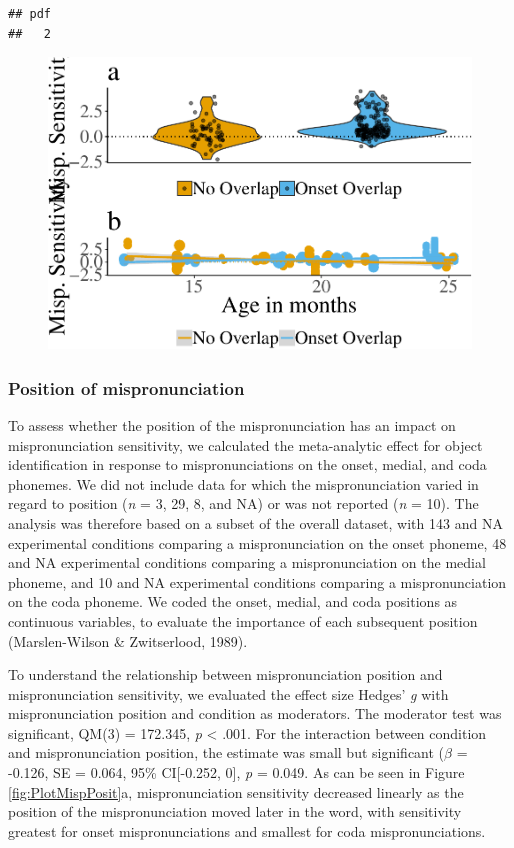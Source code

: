 \documentclass[man]{apa6}
\theoremstyle{definition}
\theoremstyle{definition}
\theoremstyle{definition}
\theoremstyle{remark}
\begin{document}
\begin{verbatim}
## pdf 
##   2
\end{verbatim}

\begin{figure}
\centering
\includegraphics{VonHolzenBergmann_MPMetaAnalysis_files/figure-latex/PlotDistOverlap-1.pdf}
\caption{}
\end{figure}

\subsubsection{Position of
mispronunciation}\label{position-of-mispronunciation}

To assess whether the position of the mispronunciation has an impact on
mispronunciation sensitivity, we calculated the meta-analytic effect for
object identification in response to mispronunciations on the onset,
medial, and coda phonemes. We did not include data for which the
mispronunciation varied in regard to position (\emph{n} = 3, 29, 8, and
NA) or was not reported (\emph{n} = 10). The analysis was therefore
based on a subset of the overall dataset, with 143 and NA experimental
conditions comparing a mispronunciation on the onset phoneme, 48 and NA
experimental conditions comparing a mispronunciation on the medial
phoneme, and 10 and NA experimental conditions comparing a
mispronunciation on the coda phoneme. We coded the onset, medial, and
coda positions as continuous variables, to evaluate the importance of
each subsequent position (Marslen-Wilson \& Zwitserlood, 1989).

To understand the relationship between mispronunciation position and
mispronunciation sensitivity, we evaluated the effect size Hedges'
\emph{g} with mispronunciation position and condition as moderators. The
moderator test was significant, QM(3) = 172.345, \emph{p} \textless{}
.001. For the interaction between condition and mispronunciation
position, the estimate was small but significant (\(\beta\) = -0.126, SE
= 0.064, 95\% CI{[}-0.252, 0{]}, \emph{p} = 0.049. As can be seen in
Figure \ref{fig:PlotMispPosit}a, mispronunciation sensitivity decreased
linearly as the position of the mispronunciation moved later in the
word, with sensitivity greatest for onset mispronunciations and smallest
for coda mispronunciations.
\end{document}
